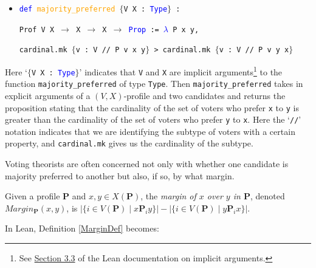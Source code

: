 \documentclass[runningheads]{llncs}
\begin{document}
\begin{itemize}
\item[] \texttt{\textcolor{blue}{def} \textcolor{orange}{majority\_preferred}  $\{$V X : \textcolor{blue}{Type}$\}$ :}

\texttt{Prof V X $\to$ X $\to$ X $\to$ \textcolor{blue}{Prop} := \textcolor{blue}{$\lambda$} P x y,}

\texttt{cardinal.mk $\{$v : V // P v x y$\}$ >
cardinal.mk $\{$v : V // P v y x$\}$}
\end{itemize}
Here `\texttt{$\{$V X : \textcolor{blue}{Type}$\}$}' indicates that \texttt{V} and \texttt{X} are implicit arguments\footnote{See \href{https://leanprover.github.io/reference/expressions.html\#implicit-arguments}{Section 3.3} of the Lean documentation on implicit arguments.} to the function \texttt{majority\_preferred} of type \texttt{Type}. Then \texttt{majority\_preferred} takes in explicit arguments of a $(V,X)$-profile and two candidates  and returns the proposition stating that the cardinality of the set of voters who prefer \texttt{x} to \texttt{y} is greater than the cardinality of the set of voters who prefer \texttt{y} to \texttt{x}. Here the `\texttt{//}' notation indicates that we are identifying the subtype of voters with a certain property, and \texttt{cardinal.mk} gives us the cardinality of the subtype.

Voting theorists are often concerned not only with whether one candidate is majority preferred to another but also, if so, by what margin.

\begin{definition}\label{MarginDef} \textnormal{Given a profile $\mathbf{P}$ and $x,y\in X(\mathbf{P})$, the \textit{margin of $x$ over $y$ in $\mathbf{P}$}, denoted $Margin_\mathbf{P}(x,y)$, is $|\{i\in V(\mathbf{P})\mid x\mathbf{P}_iy\}|-|\{i\in V(\mathbf{P})\mid y\mathbf{P}_ix\}|$.}
\end{definition}
\noindent In Lean, Definition \ref{MarginDef} becomes:
\end{document}
